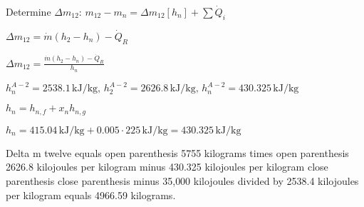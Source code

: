 Determine \( \Delta m_{12} \):  
\( m_{12} - m_n = \Delta m_{12} [h_n] + \sum \dot{Q}_i \)  

\( \Delta m_{12} = \dot{m} (h_2 - h_n) - \dot{Q}_R \)  

\( \Delta m_{12} = \frac{\dot{m} (h_2 - h_n) - \dot{Q}_R}{h_n} \)  

\( h_n^{A-2} = 2538.1 \, \text{kJ/kg}, \, h_2^{A-2} = 2626.8 \, \text{kJ/kg}, \, h_n^{A-2} = 430.325 \, \text{kJ/kg} \)  

\( h_n = h_{n,f} + x_n h_{n,g} \)  

\( h_n = 415.04 \, \text{kJ/kg} + 0.005 \cdot 225 \, \text{kJ/kg} = 430.325 \, \text{kJ/kg} \)

Delta m twelve equals open parenthesis 5755 kilograms times open parenthesis 2626.8 kilojoules per kilogram minus 430.325 kilojoules per kilogram close parenthesis close parenthesis minus 35,000 kilojoules divided by 2538.4 kilojoules per kilogram equals 4966.59 kilograms.